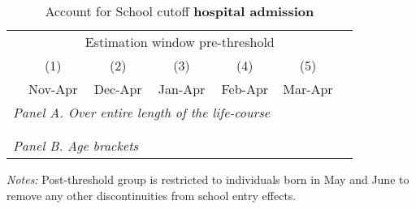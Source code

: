 \begin{table}[H] \centering 
	\begin{threeparttable} \centering \caption{Account for School cutoff \textbf{hospital admission}}\label{tab_mlch: DD_hospital2_total_school_cutoff}
		{\def\sym#1{\ifmmode^{#1}\else\(^{#1}\)\fi} 
			\begin{tabular}{l*{6}{c}}
				\toprule 
				& \multicolumn{5}{c}{Estimation window pre-threshold} \\ 
				\cmidrule(lr){2-6}
				&\multicolumn{1}{c}{(1)}&\multicolumn{1}{c}{(2)}&\multicolumn{1}{c}{(3)}&\multicolumn{1}{c}{(4)}&\multicolumn{1}{c}{(5)}\\
				&\multicolumn{1}{c}{Nov-Apr}&\multicolumn{1}{c}{Dec-Apr}&\multicolumn{1}{c}{Jan-Apr}&\multicolumn{1}{c}{Feb-Apr}&\multicolumn{1}{c}{Mar-Apr}\\
				\midrule
				\multicolumn{5}{l}{\emph{Panel A. Over entire length of the life-course}} \\
				 \\ \\
				
				\multicolumn{5}{l}{\emph{Panel B. Age brackets}} \\
				    
				\bottomrule 
		\end{tabular}}
		\begin{tablenotes} 
			\item \scriptsize \emph{Notes:} Post-threshold group is restricted to individuals born in May and June to remove any other discontinuities from school entry effects. 
		\end{tablenotes} 
	\end{threeparttable} 
\end{table}



